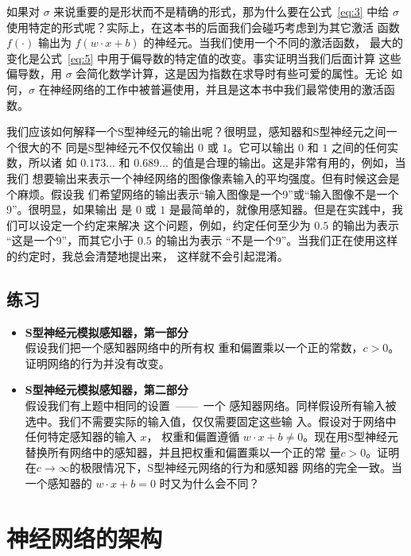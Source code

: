 如果对 $\sigma$ 来说重要的是形状而不是精确的形式，那为什么要在公式~\eqref{eq:3}
中给 $\sigma$ 使用特定的形式呢？实际上，在这本书的后面我们会碰巧考虑到为其它激活
函数 $f(\cdot)$ 输出为 $f(w \cdot x + b)$ 的神经元。当我们使用一个不同的激活函数，
最大的变化是公式~\eqref{eq:5} 中用于偏导数的特定值的改变。事实证明当我们后面计算
这些偏导数，用 $\sigma$ 会简化数学计算，这是因为指数在求导时有些可爱的属性。无论
如何，$\sigma$ 在神经网络的工作中被普遍使用，并且是这本书中我们最常使用的激活函
数。

我们应该如何解释一个S型神经元的输出呢？很明显，感知器和S型神经元之间一个很大的不
同是S型神经元不仅仅输出 $0$ 或 $1$。它可以输出 $0$ 和 $1$ 之间的任何实数，所以诸
如 $0.173\ldots$ 和 $0.689\ldots$ 的值是合理的输出。这是非常有用的，例如，当我们
想要输出来表示一个神经网络的图像像素输入的平均强度。但有时候这会是个麻烦。假设我
们希望网络的输出表示“输入图像是一个9”或“输入图像不是一个9”。很明显，如果输出
是 $0$ 或 $1$ 是最简单的，就像用感知器。但是在实践中，我们可以设定一个约定来解决
这个问题，例如，约定任何至少为 $0.5$ 的输出为表示 “这是一个9”，而其它小于
$0.5$ 的输出为表示 “不是一个9”。当我们正在使用这样的约定时，我总会清楚地提出来，
这样就不会引起混淆。

\subsection*{练习}

\begin{itemize}
\item \textbf{S型神经元模拟感知器，第一部分}\\假设我们把一个感知器网络中的所有权
  重和偏置乘以一个正的常数，$c>0$。证明网络的行为并没有改变。
\item \textbf{S型神经元模拟感知器，第二部分}\\假设我们有上题中相同的设置~——~一个
  感知器网络。同样假设所有输入被选中。我们不需要实际的输入值，仅仅需要固定这些输
  入。假设对于网络中任何特定感知器的输入 $x$， 权重和偏置遵循 $w \cdot x + b
  \neq 0$。现在用S型神经元替换所有网络中的感知器，并且把权重和偏置乘以一个正的常
  量$c>0$。证明在$c \rightarrow \infty$的极限情况下，S型神经元网络的行为和感知器
  网络的完全一致。当一个感知器的 $w \cdot x + b = 0$ 时又为什么会不同？
\end{itemize}

\section{神经网络的架构}

